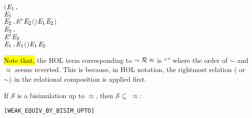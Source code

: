 \begin{definition}
\begin{alltt}
         \ensuremath{(}\HOLSymConst{\HOLTokenForall{}}\ensuremath{\HOLBoundVar{E}\sb{\mathrm{1}}}.
               \HOLTokenTransBegin\HOLSymConst{\ensuremath{\tau}}\HOLTokenTransEnd \ensuremath{\HOLBoundVar{E}\sb{\mathrm{1}}} \HOLSymConst{\HOLTokenImp{}}
              \HOLSymConst{\HOLTokenExists{}}\ensuremath{\HOLBoundVar{E}\sb{\mathrm{2}}}. \ensuremath{\HOLBoundVar{E}\sp{\prime}} \HOLSymConst{\HOLTokenEPS} \ensuremath{\HOLBoundVar{E}\sb{\mathrm{2}}} \HOLSymConst{\HOLTokenConj{}} \ensuremath{(} \HOLSymConst{\HOLTokenRCompose{}}  \HOLSymConst{\HOLTokenRCompose{}} \ensuremath{)} \ensuremath{\HOLBoundVar{E}\sb{\mathrm{1}}} \ensuremath{\HOLBoundVar{E}\sb{\mathrm{2}}}\ensuremath{)} \HOLSymConst{\HOLTokenConj{}}
         \HOLSymConst{\HOLTokenForall{}}\ensuremath{\HOLBoundVar{E}\sb{\mathrm{2}}}.
             \ensuremath{\HOLBoundVar{E}\sp{\prime}} \HOLTokenTransBegin\HOLSymConst{\ensuremath{\tau}}\HOLTokenTransEnd \ensuremath{\HOLBoundVar{E}\sb{\mathrm{2}}} \HOLSymConst{\HOLTokenImp{}}
             \HOLSymConst{\HOLTokenExists{}}\ensuremath{\HOLBoundVar{E}\sb{\mathrm{1}}}.  \HOLSymConst{\HOLTokenEPS} \ensuremath{\HOLBoundVar{E}\sb{\mathrm{1}}} \HOLSymConst{\HOLTokenConj{}} \ensuremath{(} \HOLSymConst{\HOLTokenRCompose{}}  \HOLSymConst{\HOLTokenRCompose{}} \ensuremath{)} \ensuremath{\HOLBoundVar{E}\sb{\mathrm{1}}} \ensuremath{\HOLBoundVar{E}\sb{\mathrm{2}}}
\end{alltt}
\end{definition}
\hl{Note that,} the HOL term corresponding to $\sim {\cal R} \approx$ is
``'' where the order of
$\sim$ and $\approx$ seems reverted. This is because, in HOL
notation, the rightmost relation ( or $\sim$) in the relational composition is
applied first.

\begin{theorem}
If $\mathcal{S}$ is a bisimulation up to $\approx$, then
$\mathcal{S} \subseteq\;\approx$:
\begin{alltt}
\HOLTokenTurnstile{}   \HOLSymConst{\HOLTokenConj{}}    \HOLSymConst{\HOLTokenImp{}}  \HOLSymConst{\HOLTokenWeakEQ} \hfill{[WEAK_EQUIV_BY_BISIM_UPTO]}
\end{alltt}
\end{theorem}

